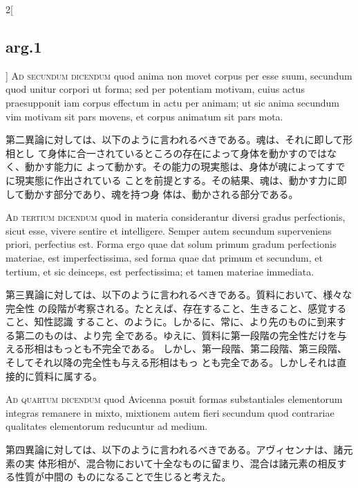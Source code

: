 \documentclass[paper=a4paper,fontsize=10pt,jafontsize=9pt,titlepage]{jlreq}
\begin{document}
\begin{paracol}{2}[\subsection{arg.1}]
{\scshape Ad secundum dicendum} quod anima non movet corpus per esse suum,
secundum quod unitur corpori ut forma; sed per potentiam motivam, cuius actus
praesupponit iam corpus effectum in actu per animam; ut sic anima secundum vim
motivam sit pars movens, et corpus animatum sit pars mota.

\switchcolumn

 第二異論に対しては、以下のように言われるべきである。魂は、それに即して形相とし
 て身体に合一されているところの存在によって身体を動かすのではなく、動かす能力に
 よって動かす。その能力の現実態は、身体が魂によってすでに現実態に作出されている
 ことを前提とする。その結果、魂は、動かす力に即して動かす部分であり、魂を持つ身
 体は、動かされる部分である。
 
\switchcolumn*[\subsection{ad 3}]

{\scshape Ad tertium dicendum} quod in materia considerantur diversi gradus
perfectionis, sicut esse, vivere sentire et intelligere. Semper autem secundum
superveniens priori, perfectius est. Forma ergo quae dat solum primum gradum
perfectionis materiae, est imperfectissima, sed forma quae dat primum et
secundum, et tertium, et sic deinceps, est perfectissima; et tamen materiae
immediata.

\switchcolumn

 第三異論に対しては、以下のように言われるべきである。質料において、様々な完全性
 の段階が考察される。たとえば、存在すること、生きること、感覚すること、知性認識
 すること、のように。しかるに、常に、より先のものに到来する第二のものは、より完
 全である。ゆえに、質料に第一段階の完全性だけを与える形相はもっとも不完全である。
 しかし、第一段階、第二段階、第三段階、そしてそれ以降の完全性も与える形相はもっ
 とも完全である。しかしそれは直接的に質料に属する。
 
\switchcolumn*[\subsection{ad 4}]


{\scshape Ad quartum dicendum} quod Avicenna posuit formas substantiales
elementorum integras remanere in mixto, mixtionem autem fieri secundum quod
contrariae qualitates elementorum reducuntur ad medium.


\switchcolumn

 第四異論に対しては、以下のように言われるべきである。アヴィセンナは、諸元素の実
 体形相が、混合物において十全なものに留まり、混合は諸元素の相反する性質が中間の
 ものになることで生じると考えた。
 

\end{paracol}
\end{document}
